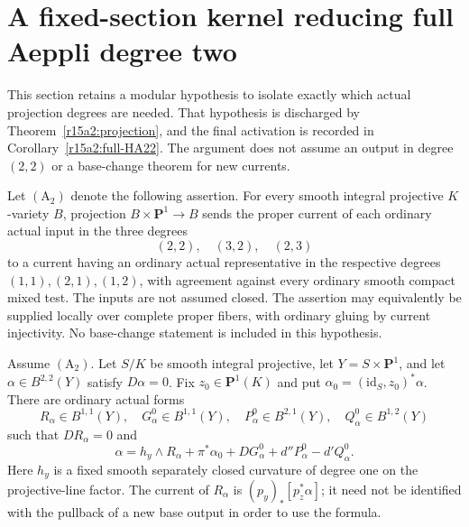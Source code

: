 \section{A fixed-section kernel reducing full Aeppli degree two}
\label{r15fs:section}

This section retains a modular hypothesis to isolate exactly
which actual projection degrees are needed. That hypothesis is
discharged by Theorem~\ref{r15a2:projection}, and the final
activation is recorded in Corollary~\ref{r15a2:full-HA22}.
The argument does not assume an output in degree $(2,2)$
or a base-change theorem for new currents.

\begin{definition}
\label{r15fs:hypothesis}
Let $(\mathrm A_2)$ denote the following assertion. For every
smooth integral projective $K$-variety $B$, projection
$B\times\mathbf P^1\to B$ sends the proper current of
each ordinary actual input in the three degrees
\[
                         (2,2),\quad(3,2),\quad(2,3)
\tag{FX15.1}\label{r15fs:input-degrees}
\]
to a current having an ordinary actual representative in
the respective degrees $(1,1),(2,1),(1,2)$, with agreement
against every ordinary smooth compact mixed test.
The inputs are not assumed closed. The assertion may
equivalently be supplied locally over complete proper
fibers, with ordinary gluing by current injectivity.
No base-change statement is included in this hypothesis.
\end{definition}

\begin{proposition}
\label{r15fs:homotopy}
Assume $(\mathrm A_2)$. Let $S/K$ be smooth integral
projective, let $Y=S\times\mathbf P^1$, and let
$\alpha\in B^{2,2}(Y)$ satisfy $D\alpha=0$.
Fix $z_0\in\mathbf P^1(K)$ and put
$\alpha_0=(\mathrm{id}_S,z_0)^*\alpha$.
There are ordinary actual forms
\[
 R_\alpha\in B^{1,1}(Y),\quad
 G_\alpha^0\in B^{1,1}(Y),\quad
 P_\alpha^0\in B^{2,1}(Y),\quad
 Q_\alpha^0\in B^{1,2}(Y)
\]
such that $DR_\alpha=0$ and
\[
 \alpha=h_y\wedge R_\alpha+\pi^*\alpha_0
               +DG_\alpha^0+d''P_\alpha^0-d'Q_\alpha^0.
\tag{FX15.2}\label{r15fs:formula}
\]
Here $h_y$ is a fixed smooth separately closed curvature
of degree one on the projective-line factor. The current
of $R_\alpha$ is $(p_y)_*[p_z^*\alpha]$; it need not
be identified with the pullback of a new base output in
order to use the formula.
\end{proposition}

